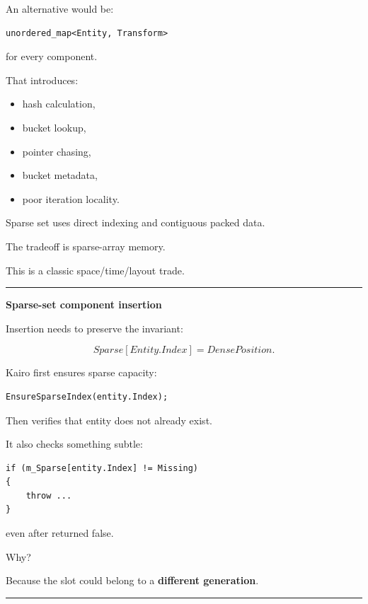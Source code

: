 An alternative would be:

\begin{verbatim}
unordered_map<Entity, Transform>
\end{verbatim}

for every component.

That introduces:

\begin{itemize}
\tightlist
\item
  hash calculation,
\item
  bucket lookup,
\item
  pointer chasing,
\item
  bucket metadata,
\item
  poor iteration locality.
\end{itemize}

Sparse set uses direct indexing and contiguous packed data.

The tradeoff is sparse-array memory.

This is a classic space/time/layout trade.

\begin{center}\rule{0.5\linewidth}{0.5pt}\end{center}

\textbf{Sparse-set component insertion}

Insertion needs to preserve the invariant:

\[
Sparse[Entity.Index]=DensePosition.
\]

Kairo first ensures sparse capacity:

\begin{verbatim}
EnsureSparseIndex(entity.Index);
\end{verbatim}

Then verifies that entity does not already exist.

It also checks something subtle:

\begin{verbatim}
if (m_Sparse[entity.Index] != Missing)
{
    throw ...
}
\end{verbatim}

even after  returned false.

Why?

Because the slot could belong to a \textbf{different generation}.

\begin{center}\rule{0.5\linewidth}{0.5pt}\end{center}

